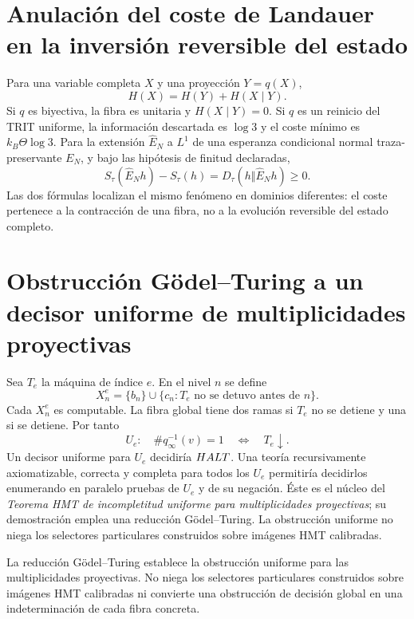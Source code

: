 \section{Anulación del coste de Landauer en la inversión reversible del estado}

Para una variable completa \(X\) y una proyección \(Y=q(X)\),
\[
 H(X)=H(Y)+H(X\mid Y).
\]
Si \(q\) es biyectiva, la fibra es unitaria y \(H(X\mid Y)=0\). Si \(q\)
es un reinicio del TRIT uniforme, la información descartada es \(\log3\) y
el coste mínimo es \(k_B\Theta\log3\). Para la extensión
\(\widehat E_N\) a \(L^1\) de una esperanza condicional normal
traza-preservante \(E_N\), y bajo las hipótesis de finitud declaradas,
\[
 S_\tau(\widehat E_Nh)-S_\tau(h)
 =D_\tau(h\Vert \widehat E_Nh)\ge0.
\]
Las dos fórmulas localizan el mismo fenómeno en dominios diferentes: el
coste pertenece a la contracción de una fibra, no a la evolución reversible
del estado completo.

\section{Obstrucción Gödel–Turing a un decisor uniforme de multiplicidades proyectivas}

Sea \(T_e\) la máquina de índice \(e\). En el nivel \(n\) se define
\[
 X_n^e=\{b_n\}\cup
 \{c_n:T_e\text{ no se detuvo antes de }n\}.
\]
Cada \(X_n^e\) es computable. La fibra global tiene dos ramas si \(T_e\) no
se detiene y una si se detiene. Por tanto
\[
 U_e:\quad \#q_\infty^{-1}(v)=1
 \quad\Longleftrightarrow\quad T_e\downarrow.
\]
Un decisor uniforme para \(U_e\) decidiría \(HALT\). Una teoría
recursivamente axiomatizable, correcta y completa para todos los \(U_e\)
permitiría decidirlos enumerando en paralelo pruebas de \(U_e\) y de su
negación. Éste es el núcleo del \emph{Teorema HMT de incompletitud uniforme
para multiplicidades proyectivas}; su demostración emplea una reducción
Gödel--Turing. La obstrucción uniforme no niega los selectores particulares
construidos sobre imágenes HMT calibradas.

\begin{controlbox}[title={Alcance del control de incompletitud uniforme}]
La reducción Gödel--Turing establece la obstrucción uniforme para las
multiplicidades proyectivas. No niega los selectores particulares construidos
sobre imágenes HMT calibradas ni convierte una obstrucción de decisión global
en una indeterminación de cada fibra concreta.
\end{controlbox}
